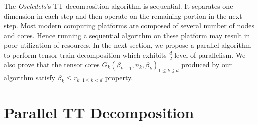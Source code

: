 \documentclass[runningheads]{llncs}
\begin{document}
The \textit{Oseledets}'s TT-decomposition algorithm is sequential. It separates one dimension in each step and then operate on the remaining portion in the next step. Most modern computing platforms are composed of several number of nodes and cores. Hence running a sequential algorithm on these platform may result in poor utilization of resources. In the next section, we propose a parallel algorithm to perform tensor train decomposition which exhibits $\frac{d}{2}$-level of parallelism. We also prove that the tensor cores $G_k(\beta_{k-1}, n_k, \beta_k) _{1\le k\le d}$ produced by our algorithm satisfy $\beta_k \le r_k$ $_{1\le k < d}$ property.
  

\section{Parallel TT Decomposition}
\label{sec:tt_parallel}
\end{document}
